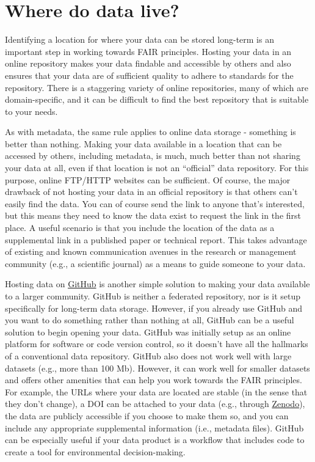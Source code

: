 \documentclass[
]{book}
\begin{document}
\hypertarget{datahome}{%
\section{Where do data live?}\label{datahome}}

Identifying a location for where your data can be stored long-term is an important step in working towards FAIR principles. Hosting your data in an online repository makes your data findable and accessible by others and also ensures that your data are of sufficient quality to adhere to standards for the repository. There is a staggering variety of online repositories, many of which are domain-specific, and it can be difficult to find the best repository that is suitable to your needs.

As with metadata, the same rule applies to online data storage - something is better than nothing. Making your data available in a location that can be accessed by others, including metadata, is much, much better than not sharing your data at all, even if that location is not an ``official'' data repository. For this purpose, online FTP/HTTP websites can be sufficient. Of course, the major drawback of not hosting your data in an official repository is that others can't easily find the data. You can of course send the link to anyone that's interested, but this means they need to know the data exist to request the link in the first place. A useful scenario is that you include the location of the data as a supplemental link in a published paper or technical report. This takes advantage of existing and known communication avenues in the research or management community (e.g., a scientific journal) as a means to guide someone to your data.

Hosting data on \href{https://github.com/}{GitHub} is another simple solution to making your data available to a larger community. GitHub is neither a federated repository, nor is it setup specifically for long-term data storage. However, if you already use GitHub and you want to do something rather than nothing at all, GitHub can be a useful solution to begin opening your data. GitHub was initially setup as an online platform for software or code version control, so it doesn't have all the hallmarks of a conventional data repository. GitHub also does not work well with large datasets (e.g., more than 100 Mb). However, it can work well for smaller datasets and offers other amenities that can help you work towards the FAIR principles. For example, the URLs where your data are located are stable (in the sense that they don't change), a DOI can be attached to your data (e.g., through \href{https://zenodo.org/}{Zenodo}), the data are publicly accessible if you choose to make them so, and you can include any appropriate supplemental information (i.e., metadata files). GitHub can be especially useful if your data product is a workflow that includes code to create a tool for environmental decision-making.
\end{document}
